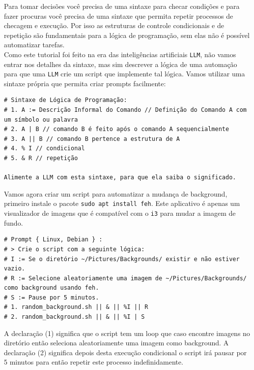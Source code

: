 \documentclass[12pt,a4paper]{article}
\begin{document}
Para tomar decisões você precisa de uma sintaxe para checar condições e para fazer procuras você precisa de uma sintaxe que permita repetir processos de checagem e execução. Por isso as estruturas de controle condicionais e de repetição são fundamentais para a lógica de programação, sem elas não é possível automatizar tarefas. \\

Como este tutorial foi feito na era das inteligências artificiais \texttt{LLM}, não vamos entrar nos detalhes da sintaxe, mas sim descrever a lógica de uma automação para que uma \texttt{LLM} crie um script que implemente tal lógica. Vamos utilizar uma sintaxe própria que permita criar prompts facilmente: \\

\begin{lstlisting}
# Sintaxe de Lógica de Programação:
# 1. A := Descrição Informal do Comando // Definição do Comando A com um símbolo ou palavra
# 2. A | B // comando B é feito após o comando A sequencialmente
# 3. A || B // comando B pertence a estrutura de A 
# 4. % I // condicional 
# 5. & R // repetição 

Alimente a LLM com esta sintaxe, para que ela saiba o significado. 
\end{lstlisting}

\vspace{\baselineskip}

Vamos agora criar um script para automatizar a mudança de background, primeiro instale o pacote \texttt{sudo apt install feh}. Este aplicativo é apenas um visualizador de imagens que é compatível com o \texttt{i3} para mudar a imagem de fundo. \\

\begin{lstlisting}
# Prompt { Linux, Debian } :
# > Crie o script com a seguinte lógica:
# I := Se o diretório ~/Pictures/Backgrounds/ existir e não estiver vazio.
# R := Selecione aleatoriamente uma imagem de ~/Pictures/Backgrounds/ como background usando feh.
# S := Pause por 5 minutos.
# 1. random_background.sh || & || %I || R 
# 2. random_background.sh || & || %I | S 
\end{lstlisting}

\vspace{\baselineskip}

A declaração (1) significa que o script tem um loop que caso encontre imagens no diretório então seleciona aleatoriamente uma imagem como background. A declaração (2) significa depois desta execução condicional o script irá pausar por 5 minutos para então repetir este processo indefinidamente. \\
\end{document}

